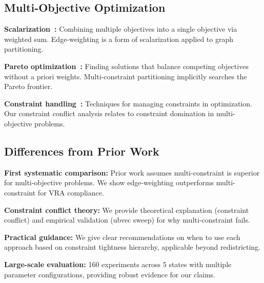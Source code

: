 \subsection{Multi-Objective Optimization}

\textbf{Scalarization~\cite{marler2004survey}:} Combining multiple objectives into a single objective via weighted sum. Edge-weighting is a form of scalarization applied to graph partitioning.

\textbf{Pareto optimization~\cite{deb2001multi}:} Finding solutions that balance competing objectives without a priori weights. Multi-constraint partitioning implicitly searches the Pareto frontier.

\textbf{Constraint handling~\cite{coello2002theoretical}:} Techniques for managing constraints in optimization. Our constraint conflict analysis relates to constraint domination in multi-objective problems.

\subsection{Differences from Prior Work}

\textbf{First systematic comparison:} Prior work assumes multi-constraint is superior for multi-objective problems. We show edge-weighting outperforms multi-constraint for VRA compliance.

\textbf{Constraint conflict theory:} We provide theoretical explanation (constraint conflict) and empirical validation (ubvec sweep) for why multi-constraint fails.

\textbf{Practical guidance:} We give clear recommendations on when to use each approach based on constraint tightness hierarchy, applicable beyond redistricting.

\textbf{Large-scale evaluation:} 160 experiments across 5 states with multiple parameter configurations, providing robust evidence for our claims.

